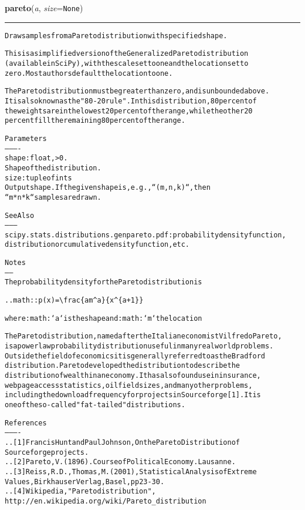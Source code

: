 \hspace{.8\funcindent}\begin{boxedminipage}{\funcwidth}

    \raggedright \textbf{pareto}(\textit{a}, \textit{size}={\tt None})

    \vspace{-1.5ex}

    \rule{\textwidth}{0.5\fboxrule}
\setlength{\parskip}{2ex}
\begin{alltt}
Draw samples from a Pareto distribution with specified shape.

This is a simplified version of the Generalized Pareto distribution
(available in SciPy), with the scale set to one and the location set to
zero. Most authors default the location to one.

The Pareto distribution must be greater than zero, and is unbounded above.
It is also known as the "80-20 rule".  In this distribution, 80 percent of
the weights are in the lowest 20 percent of the range, while the other 20
percent fill the remaining 80 percent of the range.

Parameters
----------
shape : float, {\textgreater} 0.
    Shape of the distribution.
size : tuple of ints
    Output shape.  If the given shape is, e.g., ``(m, n, k)``, then
    ``m * n * k`` samples are drawn.

See Also
--------
scipy.stats.distributions.genpareto.pdf : probability density function,
    distribution or cumulative density function, etc.

Notes
-----
The probability density for the Pareto distribution is

.. math:: p(x) = {\textbackslash}frac\{am{\textasciicircum}a\}\{x{\textasciicircum}\{a+1\}\}

where :math:`a` is the shape and :math:`m` the location

The Pareto distribution, named after the Italian economist Vilfredo Pareto,
is a power law probability distribution useful in many real world problems.
Outside the field of economics it is generally referred to as the Bradford
distribution. Pareto developed the distribution to describe the
distribution of wealth in an economy.  It has also found use in insurance,
web page access statistics, oil field sizes, and many other problems,
including the download frequency for projects in Sourceforge [1].  It is
one of the so-called "fat-tailed" distributions.


References
----------
.. [1] Francis Hunt and Paul Johnson, On the Pareto Distribution of
       Sourceforge projects.
.. [2] Pareto, V. (1896). Course of Political Economy. Lausanne.
.. [3] Reiss, R.D., Thomas, M.(2001), Statistical Analysis of Extreme
       Values, Birkhauser Verlag, Basel, pp 23-30.
.. [4] Wikipedia, "Pareto distribution",
       http://en.wikipedia.org/wiki/Pareto\_distribution


\end{alltt}
\end{boxedminipage}
